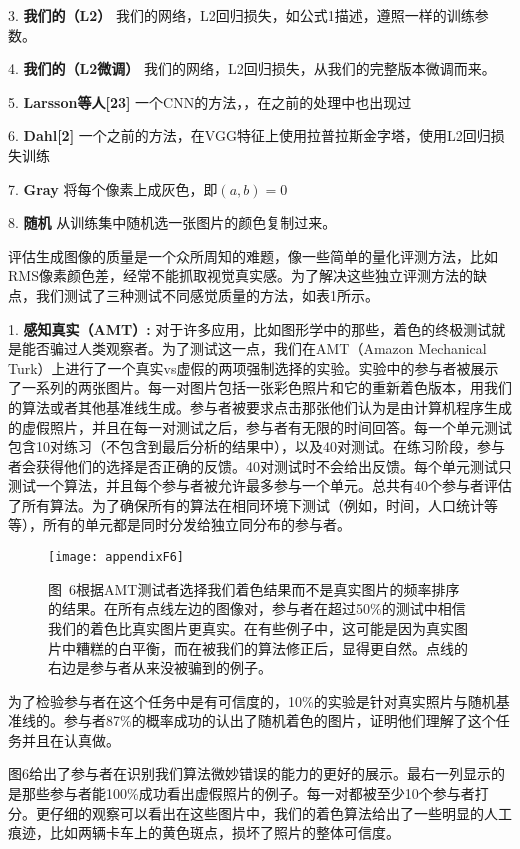 3. \textbf{我们的（L2）} 我们的网络，L2回归损失，如公式1描述，遵照一样的训练参数。

4. \textbf{我们的（L2微调）} 我们的网络，L2回归损失，从我们的完整版本微调而来。

5. \textbf{Larsson等人[23]} 一个CNN的方法，，在之前的处理中也出现过

6. \textbf{Dahl[2]} 一个之前的方法，在VGG特征上使用拉普拉斯金字塔，使用L2回归损失训练

7. \textbf{Gray} 将每个像素上成灰色，即$(a,b)=0$

8. \textbf{随机} 从训练集中随机选一张图片的颜色复制过来。

评估生成图像的质量是一个众所周知的难题，像一些简单的量化评测方法，比如RMS像素颜色差，经常不能抓取视觉真实感。为了解决这些独立评测方法的缺点，我们测试了三种测试不同感觉质量的方法，如表1所示。

1. \textbf{感知真实（AMT）: } 对于许多应用，比如图形学中的那些，着色的终极测试就是能否骗过人类观察者。为了测试这一点，我们在AMT（Amazon Mechanical Turk）上进行了一个真实vs虚假的两项强制选择的实验。实验中的参与者被展示了一系列的两张图片。每一对图片包括一张彩色照片和它的重新着色版本，用我们的算法或者其他基准线生成。参与者被要求点击那张他们认为是由计算机程序生成的虚假照片，并且在每一对测试之后，参与者有无限的时间回答。每一个单元测试包含10对练习（不包含到最后分析的结果中），以及40对测试。在练习阶段，参与者会获得他们的选择是否正确的反馈。40对测试时不会给出反馈。每个单元测试只测试一个算法，并且每个参与者被允许最多参与一个单元。总共有40个参与者评估了所有算法。为了确保所有的算法在相同环境下测试（例如，时间，人口统计等等），所有的单元都是同时分发给独立同分布的参与者。

\begin{figure}[h]
  \centering
  \texttt{[image: appendixF6]}
  \caption*{图~6\quad 根据AMT测试者选择我们着色结果而不是真实图片的频率排序的结果。在所有点线左边的图像对，参与者在超过50\%的测试中相信我们的着色比真实图片更真实。在有些例子中，这可能是因为真实图片中糟糕的白平衡，而在被我们的算法修正后，显得更自然。点线的右边是参与者从来没被骗到的例子。}
  \label{tab:badfigure7}
\end{figure}

为了检验参与者在这个任务中是有可信度的，10\%的实验是针对真实照片与随机基准线的。参与者87\%的概率成功的认出了随机着色的图片，证明他们理解了这个任务并且在认真做。

图6给出了参与者在识别我们算法微妙错误的能力的更好的展示。最右一列显示的是那些参与者能100\%成功看出虚假照片的例子。每一对都被至少10个参与者打分。更仔细的观察可以看出在这些图片中，我们的着色算法给出了一些明显的人工痕迹，比如两辆卡车上的黄色斑点，损坏了照片的整体可信度。

